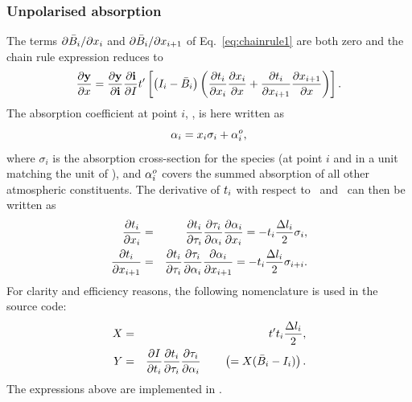\subsubsection{Unpolarised absorption}
%
The terms $\partial\bar{B}_i/\partial x_{i}$ and
$\partial\bar{B}_i/\partial x_{i+1}$ of Eq.~\ref{eq:chainrule1} are both
zero and the chain rule expression reduces to
\begin{displaymath}
  \frac{\partial\mathbf{y}}{\partial x} =  
  \frac{\partial\mathbf{y}}{\partial\mathbf{i}}
  \frac{\partial\mathbf{i}}{\partial I} t' \left[
      \left(I_{i}-\bar{B}_i\right)
      \left(
        \frac{\partial t_{i}}{\partial x_{i}}
        \frac{\partial x_{i}}{\partial x} + 
        \frac{\partial t_{i}}{\partial x_{i+1}}  
        \frac{\partial x_{i+1}}{\partial x} 
      \right) \right].
\end{displaymath}
The absorption coefficient at point $i$, , is here written as
\begin{equation}
  \label{eq:wfuns:crossec1}
  {\alpha}_{i} = x_{i}\sigma_i + {\alpha}_{i}^o,
\end{equation}
where $\sigma_i$ is the absorption cross-section for the species (at point $i$
and in a unit matching the unit of \SttElm), and ${\alpha}_{i}^o$ covers the
summed absorption of all other atmospheric constituents. The derivative of
$t_{i}$ with respect to \ and \ can then be written
as
\begin{eqnarray}
  \frac{\partial t_{i}}{\partial x_{i}} &=&
    \frac{\partial t_{i}}{\partial\tau_{i}}
    \frac{\partial\tau_{i}}{\partial{\alpha}_{i}}
    \frac{\partial{\alpha}_{i}}{\partial x_{i}} = 
    -t_{i}\frac{\Delta l_{i}}{2}\sigma_i, \\
  \frac{\partial t_{i}}{\partial x_{i+1}} &=& 
    \frac{\partial t_{i}}{\partial\tau_{i}}
    \frac{\partial\tau_{i}}{\partial{\alpha}_{i}}
    \frac{\partial{\alpha}_{i}}{\partial x_{i+1}} = 
    -t_{i}\frac{\Delta l_{i}}{2}\sigma_{i+i}.
\end{eqnarray}
For clarity and efficiency reasons, the following nomenclature is used in the
source code:
\begin{eqnarray}
  X &=& t' t_{i}\frac{\Delta l_{i}}{2}, \\
  Y &=& \frac{\partial I}{\partial t_{i}}
        \frac{\partial t_{i}}{\partial\tau_{i}}
        \frac{\partial\tau_{i}}{\partial{\alpha}_{i}}
    \qquad \left( = X(\bar{B}_i-I_{i}) \right).
\end{eqnarray}
The expressions above are implemented in .

